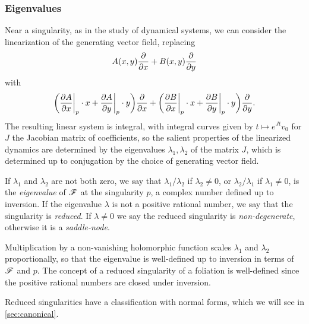 
\subsubsection{Eigenvalues}

Near a singularity, as in the study of dynamical systems, we can consider the
linearization of the generating vector field, replacing
\begin{equation*}
    A(x,y)\pdv{}{x} + B(x,y)\pdv{}{y}
\end{equation*}
with
\begin{equation*}
    \biggl(\pdv{A}{x}\bigg|_p\cdot x+\pdv{A}{y}\bigg|_p\cdot y\biggr)\pdv{}{x}
        + \biggl(\pdv{B}{x}\bigg|_p\cdot x+\pdv{B}{y}\bigg|_p\cdot y\biggr)
            \pdv{}{y}.
\end{equation*}
The resulting linear system is integral, with integral curves given by
$t\mapsto e^{Jt}v_0$ for $J$ the Jacobian matrix of coefficients, so the salient
properties of the linearized dynamics are determined by the eigenvalues
$\lambda_1,\lambda_2$ of the matrix $J$, which is determined up to conjugation
by the choice of generating vector field.

\begin{definition}
    If $\lambda_1$ and $\lambda_2$ are not both zero, we say that
    $\lambda_1/\lambda_2$ if $\lambda_2\ne0$, or $\lambda_2/\lambda_1$ if
    $\lambda_1\ne0$, is the \emph{eigenvalue} of $\mathscr{F}$ at the singularity $p$,
    a complex number defined up to inversion. If the eigenvalue $\lambda$ is not
    a positive rational number, we say that the singularity is \emph{reduced}.
    If $\lambda\ne0$ we say the reduced singularity is \emph{non-degenerate},
    otherwise it is a \emph{saddle-node}.
\end{definition}

\begin{remark}
    Multiplication by a non-vanishing holomorphic function scales $\lambda_1$
    and $\lambda_2$ proportionally, so that the eigenvalue is well-defined up to
    inversion in terms of $\mathscr{F}$ and $p$. The concept of a reduced singularity
    of a foliation is well-defined since the positive rational numbers are
    closed under inversion.
\end{remark}

Reduced singularities have a classification with normal forms, which we will see
in \cref{sec:canonical}.

